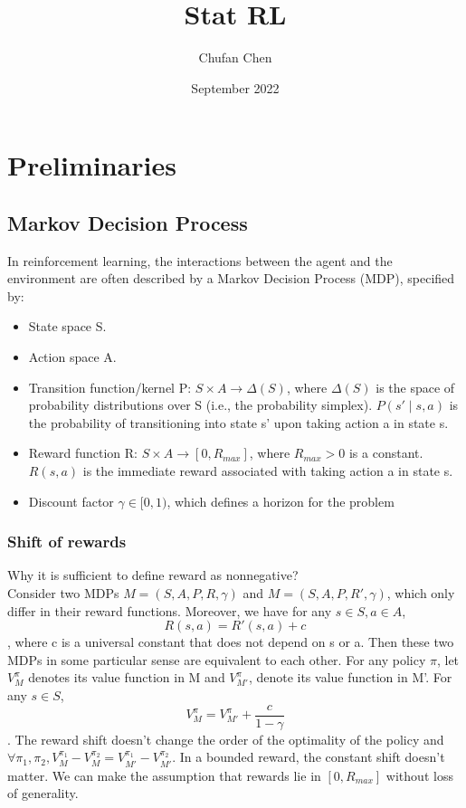 \documentclass{report}
\title{Stat RL}
\author{Chufan Chen}
\date{September 2022}
\begin{document}
\maketitle
\tableofcontents
\chapter{Preliminaries}

\section{Markov Decision Process}
In reinforcement learning, the interactions between the agent and the environment are often described
by a Markov Decision Process (MDP)\cite{Puterman2005MarkovProgramming}, specified by: 
\begin{itemize}
    \item State space S.
    \item Action space A.
    \item Transition function/kernel P: $S \times A \rightarrow \Delta(S)$, where $\Delta(S)$ is the space of probability distributions over S (i.e., the probability simplex). $P(s'\mid s, a)$ is the probability of transitioning into state s' upon taking action a in state s.
    \item Reward function R: $ S \times A \rightarrow [0,R_{max}]$, where $R_{max} > 0$ is a constant. $R(s, a)$ is the immediate reward associated with taking action a in state s.
    \item Discount factor $\gamma \in [0,1)$, which defines a horizon for the problem
\end{itemize}

\subsection{Shift of rewards}
Why it is sufficient to define reward as nonnegative?\\
Consider two MDPs $M=(S,A,P,R,\gamma)$ and $M=(S,A,P,R',\gamma)$, which only differ in their reward functions. Moreover, we have for any $s \in S,a\in A$, \[R(s,a)=R'(s,a)+c\], where c is a universal constant that does not depend on s or a. Then these two MDPs in some particular sense are equivalent to each other. For any policy $\pi$, let $V_M^{\pi}$ denotes its value function in M and $V_{M'}^{\pi}$, denote its value function in M'. For any $s\in S$, \[V_M^{\pi}=V_{M'}^{\pi}+\frac{c}{1-\gamma}\]. The reward shift doesn't change the order of the optimality of the policy and $\forall \pi_1, \pi_2, V_{M}^{\pi_1}-V_{M}^{\pi_2}=V_{M'}^{\pi_1}-V_{M'}^{\pi_2}$. In a bounded reward, the constant shift doesn't matter. We can make the assumption that rewards lie in $[0, R_{max}]$ without loss of generality.
\end{document}

